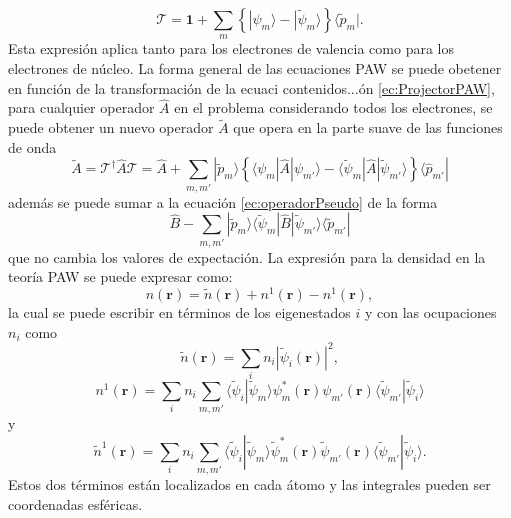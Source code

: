 \documentclass[12pt,a4paper, oneside]{book}
\begin{document}
   \begin{equation}
   \mathcal{T} = \pmb{1} + \sum_m \left\{ |\psi_m\rangle - |\tilde{\psi}_m \rangle \right\} \langle \tilde{p}_m |. \label{ec:ProjectorPAW}
   \end{equation}
   Esta expresi\'on aplica tanto para los electrones de valencia como para los electrones de n\'ucleo.
   \newline
   La forma general de las ecuaciones PAW se puede obetener en funci\'on de la transformaci\'on de la ecuaci   contenidos...\'on \ref{ec:ProjectorPAW}, para cualquier operador $\hat{A}$ en el problema considerando todos los electrones, se puede obtener un nuevo operador $\tilde{A}$ que opera en la parte suave de las funciones de onda
   \begin{equation}
   \tilde{A}= \mathcal{T} ^{\dagger} \hat{A} \mathcal{T} = \hat{A} + \sum_{m,m'} |\tilde{p}_m \rangle \left\{\langle \psi_m | \hat{A} | \psi_{m'} \rangle - \langle \tilde{\psi}_m | \hat{A} | \tilde{\psi}_{m'} \rangle \right\} \langle \hat{p}_{m'}| \label{ec:operadorPseudo}
   \end{equation}
   adem\'as se puede sumar a la ecuaci\'on \ref{ec:operadorPseudo} de la forma
   \begin{equation*}
   \hat{B}-\sum_{m,m'} |\tilde{p}_m \rangle \langle \tilde{\psi}_m | \hat{B} | \tilde{\psi}_{m'} \rangle \langle \tilde{p}_{m'}| 
   \end{equation*}
   que no cambia los valores de expectaci\'on. La expresi\'on para la densidad en la teor\'ia PAW se puede expresar como:
   \begin{equation}
   n(\pmb{r}) = \tilde{n} (\pmb{r}) + n^1 (\pmb{r}) - n^1 (\pmb{r}), \label{ec:densidadPAW}
   \end{equation}
   la cual se puede escribir en t\'erminos de los eigenestados $i$ y con las ocupaciones $n_i$ como
   \begin{equation}
   \tilde{n} (\pmb{r}) = \sum_i n_i |\tilde{\psi}_i (\pmb{r})|^2, \label{ec:densPW}
   \end{equation}
   \begin{equation}
   n^1 (\pmb{r}) = \sum_i n_i \sum_{m,m'} \langle \tilde{\psi}_i | \tilde{\psi}_m \rangle \psi_m ^* (\pmb{r}) \psi_{m'} (\pmb{r}) \langle \tilde{\psi}_{m'} | \tilde{\psi}_i \rangle \label{ec:n1} 
   \end{equation}
   y
   \begin{equation}
   \tilde{n}^1 (\pmb{r}) = \sum_i n_i \sum_{m,m'} \langle \tilde{\psi}_i | \tilde{\psi}_m \rangle \tilde{\psi}_m ^* (\pmb{r}) \tilde{\psi}_{m'} (\pmb{r}) \langle \tilde{\psi}_{m'} | \tilde{\psi}_i \rangle. \label{ec:tn1}
   \end{equation}
   Estos dos t\'erminos est\'an localizados en cada \'atomo y las integrales pueden ser coordenadas esf\'ericas. 
   
\end{document}
